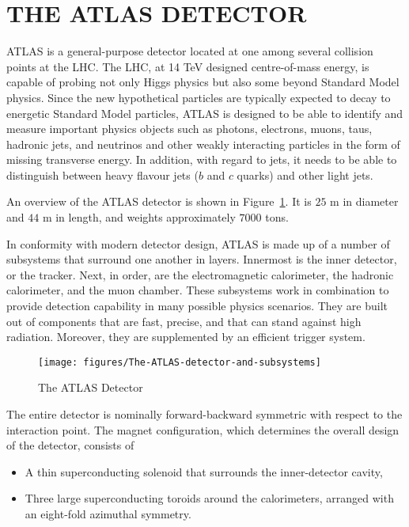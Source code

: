 \section{THE ATLAS DETECTOR}

ATLAS \cite{lhcaccexp} is a general-purpose detector located at one among
several collision points at the LHC. The LHC, at 14 TeV designed centre-of-mass
energy, is capable of probing not only Higgs physics but also some beyond
Standard Model physics. Since the new hypothetical particles are typically
expected to decay to energetic Standard Model particles, ATLAS is designed to
be able to identify and measure important physics objects such as photons,
electrons, muons, taus, hadronic jets, and neutrinos and other weakly
interacting particles in the form of missing transverse energy. In addition,
with regard to jets, it needs to be able to distinguish between heavy flavour
jets ($b$ and $c$ quarks) and other light jets.

An overview of the ATLAS detector is shown in Figure~\ref{f:atlasd}. It is $25$
m in diameter and $44$ m in length, and weights approximately $7000$ tons.

In conformity with modern detector design, ATLAS is made up of a number of
subsystems that surround one another in layers. Innermost is the inner
detector, or the tracker. Next, in order, are the electromagnetic calorimeter,
the hadronic calorimeter, and the muon chamber. These subsystems work in
combination to provide detection capability in many possible physics scenarios.
They are built out of components that are fast, precise, and that can stand
against high radiation. Moreover, they are supplemented by an efficient trigger
system.

\begin{figure}[H]
	\texttt{[image: figures/The-ATLAS-detector-and-subsystems]}
	\centering
	\caption{The ATLAS Detector}\cite{atlasdetector}
	\label{f:atlasd}
\end{figure}

The entire detector is nominally forward-backward symmetric with respect to the
interaction point. The magnet configuration, which determines the overall
design of the detector, consists of

\begin{itemize}
	\item A thin superconducting solenoid that surrounds the inner-detector cavity,

	\item Three large superconducting toroids around the calorimeters, arranged
	      with an eight-fold azimuthal symmetry.


\end{itemize}


